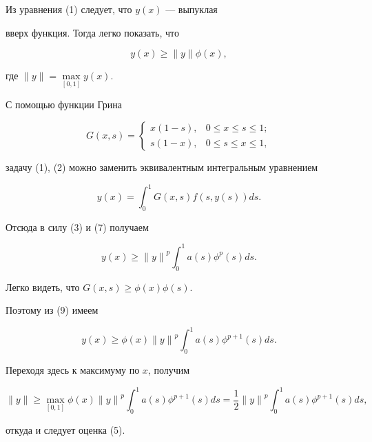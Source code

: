 \begin{pf}


Из уравнения (1) следует, что $y(x)$ --- выпуклая


вверх функция. Тогда легко показать, что


\begin{equation}


y(x)\geq \| y\| \phi (x),


\end{equation}


где $\| y\|=\max\limits_{[0,1]}y(x)$.


С помощью функции Грина


$$ 


G(x,s)=\begin{cases}


x(1-s), & 0 \leq x \leq s \leq 1;\\


s(1-x), & 0 \leq s \leq x \leq 1, 


\end{cases}


$$ 


задачу (1), (2) можно заменить эквивалентным интегральным уравнением


\begin{equation}


y(x)=\int_0^1G(x,s)f(s,y(s))ds.


\end{equation}


Отсюда в силу (3) и (7) получаем


\begin{equation}


y(x) \geq{\| y\|}^p\int_0^1a(s){\phi}^p(s)ds.


\end{equation}


Легко видеть, что $G(x,s)\geq\phi(x)\phi(s)$.


Поэтому из (9) имеем


$$


y(x)\geq


\phi(x){\| y\|}^p\int_0^1a(s){\phi}^{p+1}(s)ds.


$$


Переходя здесь к максимуму по $ x$, получим


$$


\| y\|\geq\max_{[0,1]}\phi(x)


{\| y\|}^p\int_0^1a(s){\phi}^{p+1}(s)ds=


\frac{1}{2}{\| y\|}^p\int_0^1


a(s){\phi}^{p+1}(s)ds,


$$


откуда и следует оценка (5).


\end{pf}





